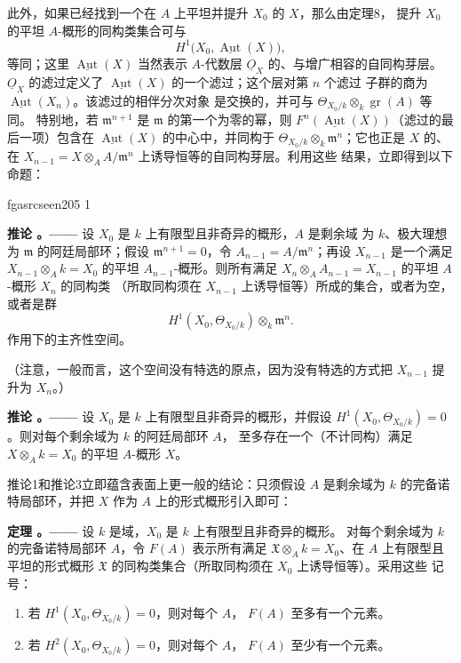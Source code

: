 \documentclass[12pt,twoside,openany]{book}
\numberwithin{equation}{section}
\newcommand{\fgaunitid}{unbound}
\newcommand{\src}[1]{%
  \phantomsection
  \hypertarget{src:\fgaunitid:#1}{}%
  \hypertarget{fga.\fgaunitid.p#1}{}%
  \ifcsname fgasrcseen#1\endcsname\else
    \expandafter\gdef\csname fgasrcseen#1\endcsname{1}%
    \hypertarget{src:#1}{}%
  \fi
  \marginpar{\raggedleft\footnotesize\sffamily #1}%
}
\newcommand{\Osh}{\underline{O}}
\theoremstyle{plain}
\theoremstyle{definition}
\theoremstyle{remark}
\newcommand{\result}[2]{%
  \par\medskip\noindent\textbf{#1%
  \if\relax\detokenize{#2}\relax\else\space#2\fi。——}\enspace
}
\begin{document}
此外，如果已经找到一个在 $A$ 上平坦并提升 $X_0$ 的 $X$，那么由定理8，
提升 $X_0$ 的平坦 $A$-概形的同构类集合可与
\[
  H^1\bigl(X_0,\underline{\operatorname{Aut}}(X)\bigr),
\]
等同；这里 $\underline{\operatorname{Aut}}(X)$ 当然表示 $A$-代数层
$\Osh_X$ 的、与增广相容的自同构芽层。$\Osh_X$ 的滤过定义了
$\underline{\operatorname{Aut}}(X)$ 的一个滤过；这个层对第 $n$ 个滤过
子群的商为 $\underline{\operatorname{Aut}}(X_n)$。该滤过的相伴分次对象
是交换的，并可与 $\Theta_{X_0/k}\otimes_k\operatorname{gr}(A)$ 等同。
特别地，若 $\mathfrak m^{n+1}$ 是 $\mathfrak m$ 的第一个为零的幂，则
$F^n(\underline{\operatorname{Aut}}(X))$（滤过的最后一项）包含在
$\underline{\operatorname{Aut}}(X)$ 的中心中，并同构于
$\Theta_{X_0/k}\otimes_k\mathfrak m^n$；它也正是 $X$ 的、在
$X_{n-1}=X\otimes_A A/\mathfrak m^n$ 上诱导恒等的自同构芽层。利用这些
结果，立即得到以下命题：

\src{205}
\result{推论}{2} 设 $X_0$ 是 $k$ 上有限型且非奇异的概形，$A$ 是剩余域
为 $k$、极大理想为 $\mathfrak m$ 的阿廷局部环；假设
$\mathfrak m^{n+1}=0$，令 $A_{n-1}=A/\mathfrak m^n$；再设 $X_{n-1}$
是一个满足 $X_{n-1}\otimes_A k=X_0$ 的平坦 $A_{n-1}$-概形。则所有满足
$X_n\otimes_A A_{n-1}=X_{n-1}$ 的平坦 $A$-概形 $X_n$ 的同构类
（所取同构须在 $X_{n-1}$ 上诱导恒等）所成的集合，或者为空，或者是群
\[
  H^1(X_0,\Theta_{X_0/k})\otimes_k\mathfrak m^n.
\]
作用下的主齐性空间。

（注意，一般而言，这个空间没有特选的原点，因为没有特选的方式把
$X_{n-1}$ 提升为 $X_n$。）

\result{推论}{3} 设 $X_0$ 是 $k$ 上有限型且非奇异的概形，并假设
$H^1(X_0,\Theta_{X_0/k})=0$。则对每个剩余域为 $k$ 的阿廷局部环 $A$，
至多存在一个（不计同构）满足 $X\otimes_A k=X_0$ 的平坦 $A$-概形 $X$。

推论1和推论3立即蕴含表面上更一般的结论：只须假设 $A$ 是剩余域为 $k$
的完备诺特局部环，并把 $X$ 作为 $A$ 上的形式概形引入即可：

\result{定理}{9} 设 $k$ 是域，$X_0$ 是 $k$ 上有限型且非奇异的概形。
对每个剩余域为 $k$ 的完备诺特局部环 $A$，令 $F(A)$ 表示所有满足
$\mathfrak X\otimes_A k=X_0$、在 $A$ 上有限型且平坦的形式概形
$\mathfrak X$ 的同构类集合（所取同构须在 $X_0$ 上诱导恒等）。采用这些
记号：
\begin{enumerate}
  \item[\textit{i.}] 若 $H^1(X_0,\Theta_{X_0/k})=0$，则对每个 $A$，
    $F(A)$ 至多有一个元素。
  \item[\textit{ii.}] 若 $H^2(X_0,\Theta_{X_0/k})=0$，则对每个 $A$，
    $F(A)$ 至少有一个元素。
\end{enumerate}
\end{document}
